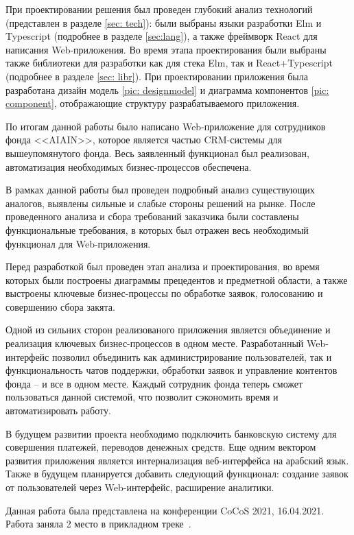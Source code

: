 \documentclass[a4paper,12pt,reqno]{article}
\begin{document}

При проектировании решения был проведен глубокий анализ технологий (представлен в разделе \ref{sec: tech}): были выбраны языки разработки Elm и Typescript (подробнее в разделе \ref{sec:lang}), а также фреймворк React для написания Web-приложения. Во время этапа проектирования были выбраны также библиотеки для разработки как для стека Elm, так и React+Typescript (подробнее в разделе \ref{sec: libr}). При проектировании приложения была разработана дизайн модель \ref{pic: designmodel} и диаграмма компонентов \ref{pic: component}, отображающие структуру разрабатываемого приложения. 


По итогам данной работы было написано Web-приложение для сотрудников фонда <<AIAIN>>, которое является частью CRM-системы для вышеупомянутого фонда. Весь заявленный функционал был реализован, автоматизация необходимых бизнес-процессов обеспечена. 

В рамках данной работы был проведен подробный анализ существующих аналогов, выявлены сильные и слабые стороны решений на рынке. После проведенного анализа и сбора требований заказчика были составлены функциональные требования, в которых был отражен весь необходимый функционал для Web-приложения. 

Перед разработкой был проведен этап анализа и проектирования, во время которых были построены диаграммы прецедентов и предметной области, а также выстроены ключевые бизнес-процессы по обработке заявок, голосованию и совершению сбора закята.

Одной из сильних сторон реализованого приложения является объединение и реализация ключевых бизнес-процессов в одном месте. Разработанный Web-интерфейс позволил объединить как администрирование пользователей, так и функциональность чатов поддержки, обработки заявок и управление контентов фонда -- и все в одном месте. Каждый сотрудник фонда теперь сможет пользоваться данной системой, что позволит сэкономить время и автоматизировать работу.

В будущем развитии проекта необходимо подключить банковскую систему для совершения платежей, переводов денежных средств. Еще одним вектором развития приложения является интернализация веб-интерфейса на арабский язык. Также в будущем планируется добавить следующий функционал: создание заявок от пользователей через Web-интерфейс, расширение аналитики.

Данная работа была представлена на конференции CoCoS 2021, 16.04.2021. Работа заняла 2 место в прикладном треке~\cite{cocos}.
\end{document}
